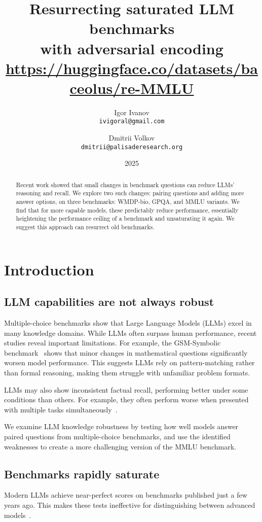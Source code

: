 \documentclass{article}
\title{Resurrecting saturated LLM benchmarks\\
with adversarial encoding\\
{\large\url{https://huggingface.co/datasets/baceolus/re-MMLU}}}
\author{
    Igor Ivanov\\
    \small\texttt{ivigoral@gmail.com} \and
    Dmitrii Volkov\\
    \small\texttt{dmitrii@palisaderesearch.org}
}
\date{2025}
\begin{document}
\maketitle

\begin{abstract}
    Recent work showed that small changes in benchmark questions can reduce LLMs' reasoning and recall. We explore two such changes: pairing questions and adding more answer options, on three benchmarks: WMDP-bio, GPQA, and MMLU variants. We find that for more capable models, these predictably reduce performance, essentially heightening the performance ceiling of a benchmark and unsaturating it again. We suggest this approach can resurrect old benchmarks.
\end{abstract}

\section{Introduction}
\subsection{LLM capabilities are not always robust}
Multiple-choice benchmarks show that Large Language Models (LLMs) excel in many knowledge domains. While LLMs often surpass human performance, recent studies reveal important limitations. For example, the GSM-Symbolic benchmark~\cite{gsmsymbolic} shows that minor changes in mathematical questions significantly worsen model performance. This suggests LLMs rely on pattern-matching rather than formal reasoning, making them struggle with unfamiliar problem formats.

LLMs may also show inconsistent factual recall, performing better under some conditions than others. For example, they often perform worse when presented with multiple tasks simultaneously~\cite{multipleprompts}.

We examine LLM knowledge robustness by testing how well models answer paired questions from multiple-choice benchmarks, and use the identified weaknesses to create a more challenging version of the MMLU benchmark.

\subsection{Benchmarks rapidly saturate}

Modern LLMs achieve near-perfect scores on benchmarks published just a few years ago. This makes these tests ineffective for distinguishing between advanced models~\cite{aiprogress}.
\end{document}
